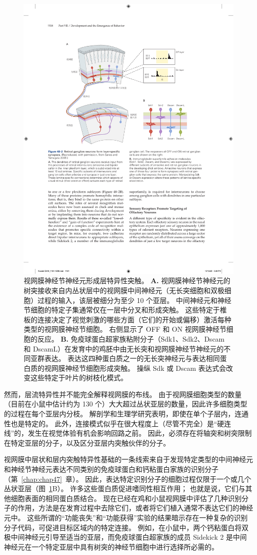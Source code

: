 \begin{figure}[htbp]
	\centering
	\includegraphics[width=0.75\linewidth]{chap48/fig_48_2}
	\caption{视网膜神经节神经元形成层特异性突触。
		\textbf{A.} 视网膜神经节神经元的树突接收来自内丛状层中的视网膜中间神经元（无长突细胞和双极细胞）过程的输入，该层被细分为至少 10 个亚层。
		中间神经元和神经节细胞的特定子集通常仅在一层中分叉和形成突触。
		这些特定于椎板的连接决定了视觉刺激的哪些方面（它们的开始或偏移）激活每种类型的视网膜神经节细胞。
		右侧显示了 OFF 和 ON 视网膜神经节细胞的反应。
		\textbf{B.} 免疫球蛋白超家族粘附分子（Sdk1、Sdk2、Dscam 和 DscamL）在发育中的鸡胚中由无长突和视网膜神经节神经元的不同亚群表达。
		表达这四种蛋白质之一的无长突神经元与表达相同蛋白质的视网膜神经节细胞形成突触。
		操纵 Sdk 或 Dscam 表达式会改变这些特定于叶片的树枝化模式。}
	\label{fig:48_2}
\end{figure}


然而，层流特异性并不能完全解释视网膜的布线。
由于视网膜细胞类型的数量（目前在小鼠中估计约为 130 个）大大超过丛状亚层的数量，因此许多细胞类型的过程在每个亚层内分枝。
解剖学和生理学研究表明，即使在单个子层内，连通性也是特定的。
此外，连接模式似乎在很大程度上（尽管不完全）是“硬连线”的，发生在视觉体验有机会影响回路之前。
因此，必须存在将轴突和树突限制在特定亚层的分子，以及区分亚层内突触伙伴的分子。


视网膜中层状和层内突触特异性基础的一条线索来自于发现特定类型的中间神经元和神经节神经元表达不同类别的免疫球蛋白和钙粘蛋白家族的识别分子（第~\ref{chap:chap47}~章）。
因此，表达特定识别分子的细胞过程仅限于一个或几个丛状亚层（图~\ref{fig:48_2}B）。
许多这些蛋白质促进嗜同性相互作用；
也就是说，它们与其他细胞表面的相同蛋白质结合。
现在已经在鸡和小鼠视网膜中评估了几种识别分子的作用，方法是在发育过程中去除它们，或者将它们植入通常不表达它们的神经元中。
这些所谓的“功能丧失”和“功能获得”实验的结果暗示存在一种复杂的识别分子代码，可促进目标区域内的特定连接。
例如，在小鼠中，两个钙粘蛋白将双极中间神经元引导至适当的亚层，而免疫球蛋白超家族的成员 Sidekick 2 是中间神经元在一个特定亚层中具有树突的神经节细胞中进行选择所必需的。



